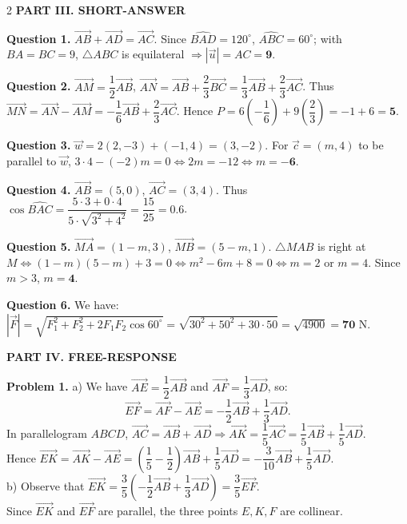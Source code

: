 \documentclass[10pt,a4paper]{article}
\begin{document}
\begin{multicols}{2}
\textbf{\color{accent}PART III. SHORT-ANSWER}

\textbf{Question 1.} $\vec{AB} + \vec{AD} = \vec{AC}$. Since $\widehat{BAD} = 120^\circ$, $\widehat{ABC} = 60^\circ$; with $BA = BC = 9$, $\triangle ABC$ is equilateral $\Rightarrow |\vec{u}| = AC = \mathbf{9}$.

\textbf{Question 2.} $\vec{AM} = \dfrac{1}{2}\vec{AB}$, $\vec{AN} = \vec{AB} + \dfrac{2}{3}\vec{BC} = \dfrac{1}{3}\vec{AB} + \dfrac{2}{3}\vec{AC}$. Thus $\vec{MN} = \vec{AN} - \vec{AM} = -\dfrac{1}{6}\vec{AB} + \dfrac{2}{3}\vec{AC}$. Hence $P = 6\left(-\dfrac{1}{6}\right) + 9\left(\dfrac{2}{3}\right) = -1 + 6 = \mathbf{5}$.

\textbf{Question 3.} $\vec{w} = 2(2, -3) + (-1, 4) = (3, -2)$. For $\vec{c} = (m, 4)$ to be parallel to $\vec{w}$, $3 \cdot 4 - (-2)m = 0 \Leftrightarrow 2m = -12 \Leftrightarrow m = \mathbf{-6}$.

\textbf{Question 4.} $\vec{AB} = (5, 0)$, $\vec{AC} = (3, 4)$. Thus $\cos\widehat{BAC} = \dfrac{5 \cdot 3 + 0 \cdot 4}{5 \cdot \sqrt{3^2+4^2}} = \dfrac{15}{25} = \mathbf{0.6}$.

\textbf{Question 5.} $\vec{MA} = (1-m, 3)$, $\vec{MB} = (5-m, 1)$. $\triangle MAB$ is right at $M \Leftrightarrow (1-m)(5-m) + 3 = 0 \Leftrightarrow m^2 - 6m + 8 = 0 \Leftrightarrow m = 2$ or $m = 4$. Since $m > 3$, $m = \mathbf{4}$.

\textbf{Question 6.} We have:\\
$|\vec{F}| = \sqrt{F_1^2 + F_2^2 + 2F_1 F_2 \cos 60^\circ} = \sqrt{30^2 + 50^2 + 30 \cdot 50} = \sqrt{4900} = \mathbf{70}\text{ N}$.

\textbf{\color{accent}PART IV. FREE-RESPONSE}

\textbf{Problem 1.}
a) We have $\vec{AE} = \dfrac{1}{2}\vec{AB}$ and $\vec{AF} = \dfrac{1}{3}\vec{AD}$, so:
$$\vec{EF} = \vec{AF} - \vec{AE} = -\dfrac{1}{2}\vec{AB} + \dfrac{1}{3}\vec{AD}.$$
In parallelogram $ABCD$, $\vec{AC} = \vec{AB} + \vec{AD} \Rightarrow \vec{AK} = \dfrac{1}{5}\vec{AC} = \dfrac{1}{5}\vec{AB} + \dfrac{1}{5}\vec{AD}$.\\
Hence $\vec{EK} = \vec{AK} - \vec{AE} = \left(\dfrac{1}{5} - \dfrac{1}{2}\right)\vec{AB} + \dfrac{1}{5}\vec{AD} = -\dfrac{3}{10}\vec{AB} + \dfrac{1}{5}\vec{AD}$.\\
b) Observe that $\vec{EK} = \dfrac{3}{5}\left(-\dfrac{1}{2}\vec{AB} + \dfrac{1}{3}\vec{AD}\right) = \dfrac{3}{5}\vec{EF}$.\\
Since $\vec{EK}$ and $\vec{EF}$ are parallel, the three points $E, K, F$ are collinear.


\end{multicols}
\end{document}
